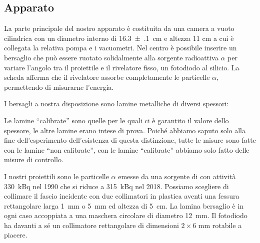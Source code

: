 \subsection{Apparato}

La parte principale del nostro apparato è costituita da una camera a vuoto cilindrica con un diametro interno di  \SI{16.3(1)}{cm} e altezza 11 cm a cui è collegata la relativa pompa e i vacuometri.
Nel centro è possibile inserire un bersaglio che può essere ruotato solidalmente alla sorgente radioattiva $\alpha$
per variare l'angolo tra il proiettile e il rivelatore fisso, un fotodiodo al silicio.
La scheda afferma che il rivelatore assorbe completamente le particelle $\alpha$,
permettendo di misurarne l'energia.

I bersagli a nostra disposizione sono lamine metalliche di diversi spessori:
Le lamine ``calibrate'' sono quelle per le quali ci è garantito il valore dello spessore,
le altre lamine erano intese di prova.
Poiché abbiamo saputo solo alla fine dell'esperimento dell'esistenza di questa distinzione,
tutte le misure sono fatte con le lamine ``non calibrate'',
con le lamine ``calibrate'' abbiamo solo fatto delle misure di controllo.

I nostri proiettili sono le particelle $\alpha$ emesse da una sorgente di \am{} con attività \SI{330}{kBq} nel 1990 che si riduce a \SI{315}{kBq} nel 2018.
Possiamo scegliere di collimare il fascio incidente con due collimatori in plastica aventi una fessura rettangolare larga \SI{1}{mm} o \SI{5}{mm} ed altezza di \SI{5}{cm}.
La lamina bersaglio è in ogni caso accoppiata a una maschera circolare di diametro \SI{12}{mm}.
Il fotodiodo ha davanti a sé un collimatore rettangolare di dimensioni $2\times 6$\! mm rotabile a piacere.

